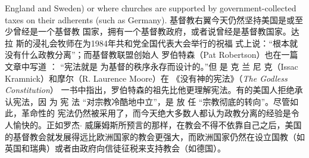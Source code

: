 \begin{paracol}{2}
England and Sweden) or where churches are supported by government-collected taxes on their adherents (such as Germany).
\switchcolumn
基督教右翼今天仍然坚持美国是或至少曾经是一个基督教
国家，拥有一个基督教政府，或者说曾经是基督教国家。达拉
斯的浸礼会牧师在为1984年共和党全国代表大会举行的祝福
式上说：“根本就没有什么政教分离”；而基督教联盟创始人
罗伯特森（Pat Robertson）也在一篇文章中写道 ： “宪法就是
为基督的秩序永存而设计的。”但 是 克 兰 尼 克（Issac Kramnick）和摩尔（R. Laurence Moore）在 《没有神的宪法》（\textit{The Godless Constitution}） 一书中指出，罗伯特森的祖先比他更理解宪法。有的美国人拒绝承认宪法，因 为 宪 法 “对宗教冷酷地中立”，是 放 任 “宗教彻底的转向”。尽管如此，革命性的
宪法仍然被采用了，而今天绝大多数人都认为政教分离的经验是令人愉快的。正如罗杰$\cdot$ 威廉姆斯所预言的那样，在教会不得不依靠自己之后，美国的基督教会就发展得远比欧洲国家的教会更强大，而欧洲国家仍然在设立国教（如英国和瑞典）或者由政府向信徒征税来支持教会（如德国）。


\end{paracol}
